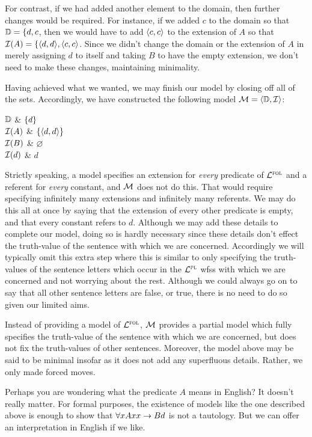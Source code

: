 For contrast, if we had added another element to the domain, then further changes would be required.
For instance, if we added $c$ to the domain so that $\mathbb{D}=\{d,c$, then we would have to add $\langle c,c\rangle$ to the extension of $A$ so that $\mathcal{I}(A)=\{\langle d,d\rangle,\langle c,c\rangle$.
Since we didn't change the domain or the extension of $A$ in merely assigning $d$ to itself and taking $B$ to have the empty extension, we don't need to make these changes, maintaining minimality.

Having achieved what we wanted, we may finish our model by closing off all of the sets.
Accordingly, we have constructed the following model $\mathcal{M}=\langle\mathbb{D},\mathcal{I}\rangle$:

\begin{partialmodel}
  $\mathbb{D}$			& $\lbrace d\rbrace$\\
	$\mathcal{I}(A)$ 	& $\lbrace\langle d,d\rangle\rbrace$\\
  $\mathcal{I}(B)$	  & $\varnothing$\\
	$\mathcal{I}(d)$	  & $d$
\end{partialmodel}

Strictly speaking, a model specifies an extension for \textit{every} predicate of $\mathcal{L}^{\textsc{fol}}$ and a referent for \textit{every} constant, and $\mathcal{M}$ does not do this.
That would require specifying infinitely many extensions and infinitely many referents.
We may do this all at once by saying that the extension of every other predicate is empty, and that every constant refers to $d$.
Although we may add these details to complete our model, doing so is hardly necessary since these details don't effect the truth-value of the sentence with which we are concerned.
Accordingly we will typically omit this extra step where this is similar to only specifying the truth-values of the sentence letters which occur in the $\mathcal{L}^{\textsc{pl}}$ wfss with which we are concerned and not worrying about the rest.
Although we could always go on to say that all other sentence letters are false, or true, there is no need to do so given our limited aims.

Instead of providing a model of $\mathcal{L}^{\textsc{fol}}$, $\mathcal{M}$ provides a partial model which fully specifies the truth-value of the sentence with which we are concerned, but does not fix the truth-values of other sentences.
Moreover, the model above may be said to be minimal insofar as it does not add any superfluous details.
Rather, we only made forced moves.

Perhaps you are wondering what the predicate $A$ means in English?
It doesn't really matter.
For formal purposes, the existence of models like the one described above is enough to show that $\forall x Axx \rightarrow Bd$ is not a tautology.
But we can offer an interpretation in English if we like.

